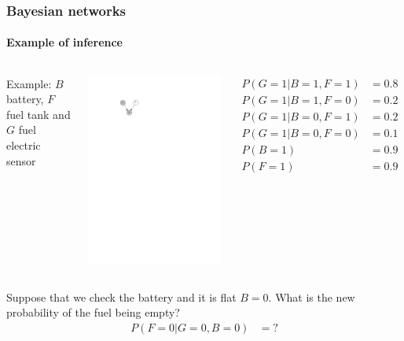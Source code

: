 \documentclass[slidestop,compress,mathserif]{beamer}
\begin{document}
\begin{frame}
	\frametitle{Bayesian networks}
	\framesubtitle{Example of inference}
     \begin{columns}
    \column[c]{6cm}
    Example: $B$ battery, $F$ fuel tank and $G$ fuel electric sensor
    \begin{center}
    \includegraphics[width=.4\textwidth]{fuel2}
    \end{center}
    \column[c]{6cm}
    \begin{align*}
    P(G=1|B=1,F=1) & = 0.8\\
    P(G=1|B=1,F=0) & = 0.2\\
    P(G=1|B=0,F=1) & = 0.2\\
    P(G=1|B=0,F=0) & = 0.1\\
    P(B=1) & = 0.9\\
    P(F=1) & = 0.9
    \end{align*}
    \end{columns}
    Suppose that we check the battery and it is flat $B=0$.
    What is the new probability of the fuel being empty?
    \begin{align*}
    P(F=0|G=0,B=0) & = ?
    \end{align*}
\end{frame}
\end{document}
